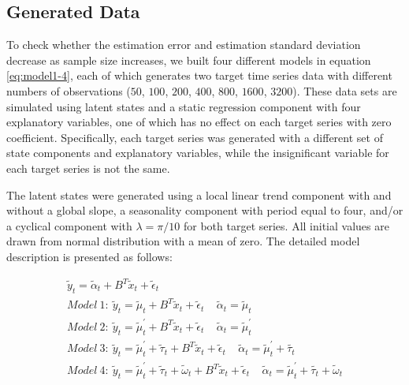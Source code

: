 \documentclass[twoside,11pt]{article}
\begin{document}
\subsection{Generated Data}
To check whether the estimation error and estimation standard deviation decrease as sample size increases, we built four different models in equation \eqref{eq:model1-4}, each of which generates two target time series data with different numbers of observations ($50$, $100$, $200$, $400$, $800$, $1600$, $3200$). These data sets are simulated using latent states and a static regression component with four explanatory variables, one of which has no effect on each target series with zero coefficient.
Specifically, each target series was generated with a different set of state components and explanatory variables, while the insignificant variable for each target series is not the same.

The latent states were generated using a local linear trend component with and without a global slope, a seasonality component with period equal to four, and/or a cyclical component with $\lambda=\pi/10$ for both target series. All initial values are drawn from normal distribution with a mean of zero. The detailed model description is presented as follows:

\begin{equation} \label{eq:model1-4}
\begin{gathered}
\tilde{y}_t=\tilde{\alpha}_t+B^T\tilde{x}_t+\tilde{\epsilon}_t\\
Model\ 1:\ \tilde{y}_t=\tilde{\mu}_t+B^T\tilde{x}_t+\tilde{\epsilon}_t \ \ \ \ \  \tilde{\alpha}_t=\tilde{\mu}_t\\
Model\ 2:\ \tilde{y}_t=\tilde{\mu}^\prime_t+B^T\tilde{x}_t+\tilde{\epsilon}_t \ \ \ \ \  \tilde{\alpha}_t=\tilde{\mu}_t^\prime\\
Model\ 3:\ \tilde{y}_t=\tilde{\mu}_t^\prime+\tilde{\tau}_t+B^T\tilde{x}_t+\tilde{\epsilon}_t \ \ \ \ \  \tilde{\alpha}_t=\tilde{\mu}_t^\prime+\tilde{\tau_t}\\
Model\ 4:\ \tilde{y}_t=\tilde{\mu}_t^\prime+\tilde{\tau}_t+\tilde{\omega}_t+B^T\tilde{x}_t+\tilde{\epsilon}_t \ \ \ \ \  \tilde{\alpha}_t=\tilde{\mu}_t^\prime+\tilde{\tau_t}+\tilde{\omega}_t
\end{gathered}
\end{equation}
\end{document}
